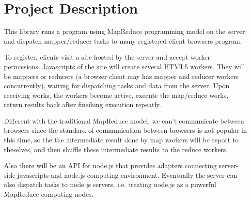 \section{Project Description}
\label{ch3}

This library runs a program using MapReduce programming model on the server and dispatch mapper/reducer tasks to many registered client browsers program.

To register, clients visit a site hosted by the server and accept worker permissions. Javascripts of the site will create several HTML5 workers. They will be mappers or reducers (a browser client may has mapper and reducer workers concurrently), waiting for dispatching tasks and data from the server. Upon receiving works, the workers become active, execute the map/reduce works, return results back after finsihing execution repeatly.

Different with the traditional MapReduce model, we can’t communicate between browsers since the standard of communication between browsers is not popular in this time, so the the intermediate result done by map workers will be report to theselves, and then shuffle these intermediate results to the reduce workers.

Also there will be an API for node.js that provides adapters connecting server-side javascripts and node.js computing environment. Eventually the server can also dispatch tasks to node.js servers, i.e. treating node.js as a powerful MapReduce computing nodes.
